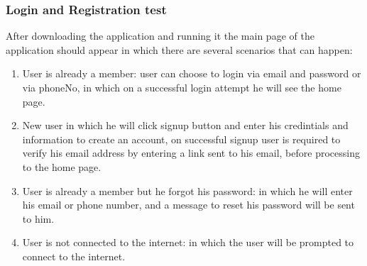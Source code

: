 \documentclass[a4paper, 12pt]{report} %
\begin{document}
            \subsubsection{Login and Registration test}
                After downloading the application and running it the main page of the application should appear in which there are several scenarios that can happen:
                \begin{enumerate}
                    \item User is already a member: user can choose to login via email and password or via phoneNo, in which on a successful login attempt he will see the home page.
                    \item New user in which he will click signup button and enter his credintials and information to create an account, on successful signup user is required to verify his email address by entering a link sent to his email, before processing to the home page.
                    \item User is already a member but he forgot his password: in which he will enter his email or phone number, and a message to reset his password will be sent to him.
                    \item User is not connected to the internet: in which the user will be prompted to connect to the internet.
                \end{enumerate}
\end{document}
